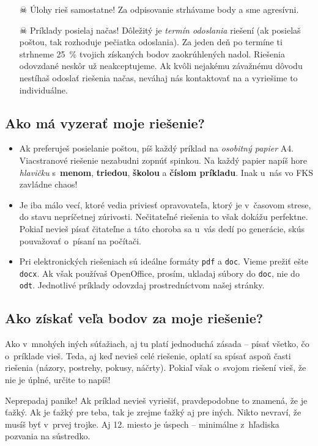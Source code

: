 \begin{itemize}
	\item[$\skull$] Úlohy rieš samostatne! Za odpisovanie strhávame body a sme agresívni. 

	\item[$\skull$] Príklady posielaj načas! Dôležitý je \emph{termín odoslania} riešení (ak posielaš poštou, tak rozhoduje pečiatka odoslania).
		Za jeden deň po termíne ti strhneme \SI{25}{\percent} tvojich získaných bodov zaokrúhlených nadol. 
		Riešenia odovzdané neskôr už neakceptujeme. Ak kvôli nejakému závažnému dôvodu nestíhaš odoslať riešenia načas, neváhaj nás kontaktovať na \URL{\seminarEmail}
		a vyriešime to individuálne.
\end{itemize}

\subsection{Ako má vyzerať moje riešenie?}
\begin{itemize}
	\item Ak preferuješ posielanie poštou, píš každý príklad na \emph{osobitný papier} A4. Viacstranové riešenie nezabudni
		zopnúť spinkou. Na každý papier napíš hore \emph{hlavičku} s~\textbf{menom}, \textbf{triedou}, \textbf{školou} a \textbf{číslom príkladu}.
		Inak u~nás vo FKS zavládne chaos!
	\item Je iba málo vecí, ktoré vedia priviesť opravovateľa, ktorý je v~časovom strese,
		do stavu nepríčetnej zúrivosti. Nečitateľné riešenia to však dokážu perfektne.
		Pokiaľ nevieš písať čitateľne a táto choroba sa u~vás dedí po generácie, skús
		pouvažovať o~písaní na počítači.
	\item Pri elektronických riešeniach sú ideálne formáty \texttt{pdf} a \texttt{doc}. Vieme prežiť ešte \texttt{docx}.
		Ak však používaš OpenOffice, prosím, ukladaj súbory do {\tt doc}, nie do {\tt odt}.
		Jednotlivé príklady odovzdaj prostredníctvom našej stránky.
\end{itemize}

\subsection{Ako získať veľa bodov za moje riešenie?}
	Ako v~mnohých iných súťažiach, aj tu platí jednoduchá zásada -- písať všetko, čo
	o~príklade vieš. Teda, aj keď nevieš celé riešenie, oplatí sa spísať aspoň časti
	riešenia (názory, postrehy, pokusy, náčrty). Pokiaľ však o~svojom riešení vieš, že
	nie je úplné, určite to napíš!

	Neprepadaj panike! Ak príklad nevieš vyriešiť, pravdepodobne to znamená, že je
	ťažký. Ak je ťažký pre teba, tak je zrejme ťažký aj pre iných. Nikto nevraví,
	že musíš byť v~prvej trojke. Aj 12. miesto je úspech -- minimálne z~hľadiska
	pozvania na sústredko.

